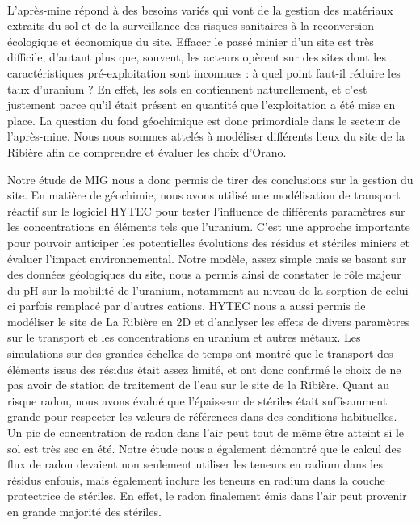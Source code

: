 \documentclass{article}
\begin{document}
\paragraph{} L'après-mine répond à des besoins variés qui vont de la gestion des matériaux extraits du sol et de la surveillance des risques sanitaires à la reconversion écologique et économique du site. Effacer le passé minier d'un site est très difficile, d'autant plus que, souvent, les acteurs opèrent sur des sites dont les caractéristiques pré-exploitation sont inconnues : à quel point faut-il réduire les taux d'uranium ? En effet, les sols en contiennent naturellement, et c'est justement parce qu'il était présent en quantité que l'exploitation a été mise en place. La question du fond géochimique est donc primordiale dans le secteur de l'après-mine. Nous nous sommes attelés à modéliser différents lieux du site de la Ribière afin de comprendre et évaluer les choix d'Orano.

Notre étude de MIG nous a donc permis de tirer des conclusions sur la gestion du site. En matière de géochimie, nous avons utilisé une modélisation de transport réactif sur le logiciel HYTEC pour tester l'influence de différents paramètres sur les concentrations en éléments tels que l'uranium. C'est une approche importante pour pouvoir anticiper les potentielles évolutions des résidus et stériles miniers et évaluer l'impact environnemental. Notre modèle, assez simple mais se basant sur des données géologiques du site, nous a permis ainsi de constater le rôle majeur du pH sur la mobilité de l'uranium, notamment au niveau de la sorption de celui-ci parfois remplacé par d'autres cations. HYTEC nous a aussi permis de modéliser le site de La Ribière en 2D et d'analyser les effets de divers paramètres sur le transport et les concentrations en uranium et autres métaux. Les simulations sur des grandes échelles de temps ont montré que le transport des éléments issus des résidus était assez limité, et ont donc confirmé le choix de ne pas avoir de station de traitement de l'eau sur le site de la Ribière. Quant au risque radon, nous avons évalué que l'épaisseur de stériles était suffisamment grande pour respecter les valeurs de références dans des conditions habituelles. Un pic de concentration de radon dans l'air peut tout de même être atteint si le sol est très sec en été. Notre étude nous a également démontré que le calcul des flux de radon devaient non seulement utiliser les teneurs en radium dans les résidus enfouis, mais également inclure les teneurs en radium dans la couche protectrice de stériles. En effet, le radon finalement émis dans l'air peut provenir en grande majorité des stériles.
\end{document}
